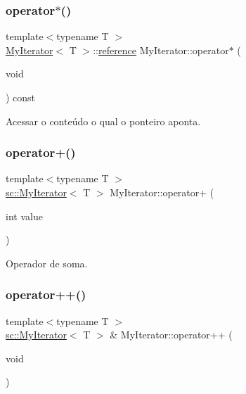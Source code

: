 \subsubsection{\texorpdfstring{operator$\ast$()}{operator*()}}
{\footnotesize\ttfamily template$<$typename T $>$ \\
\hyperlink{classsc_1_1MyIterator}{My\+Iterator}$<$ T $>$\+::\hyperlink{classsc_1_1MyIterator_a713949524e31c23eade8ea3521c938ef}{reference} My\+Iterator\+::operator$\ast$ (\begin{DoxyParamCaption}\item[{void}]{ }\end{DoxyParamCaption}) const}



Acessar o conteúdo o qual o ponteiro aponta. 

\mbox{\label{classsc_1_1MyIterator_a493264c7561ef545b06d47c0b5835d59}} 
\subsubsection{\texorpdfstring{operator+()}{operator+()}}
{\footnotesize\ttfamily template$<$typename T $>$ \\
\hyperlink{classsc_1_1MyIterator}{sc\+::\+My\+Iterator}$<$ T $>$ My\+Iterator\+::operator+ (\begin{DoxyParamCaption}\item[{int}]{value }\end{DoxyParamCaption})}



Operador de soma. 

\mbox{\label{classsc_1_1MyIterator_ae02016f0e3a1263ba48a4efe752ba966}} 
\subsubsection{\texorpdfstring{operator++()}{operator++()}\hspace{0.1cm}{\footnotesize\ttfamily [1/2]}}
{\footnotesize\ttfamily template$<$typename T $>$ \\
\hyperlink{classsc_1_1MyIterator}{sc\+::\+My\+Iterator}$<$ T $>$ \& My\+Iterator\+::operator++ (\begin{DoxyParamCaption}\item[{void}]{ }\end{DoxyParamCaption})}



